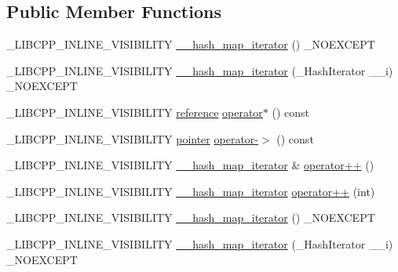 \subsection*{Public Member Functions}
\begin{DoxyCompactItemize}
\item 
\+\_\+\+L\+I\+B\+C\+P\+P\+\_\+\+I\+N\+L\+I\+N\+E\+\_\+\+V\+I\+S\+I\+B\+I\+L\+I\+T\+Y \hyperlink{class____hash__map__iterator_aa78e239cc41a9db787a22d9124f97489}{\+\_\+\+\_\+hash\+\_\+map\+\_\+iterator} () \+\_\+\+N\+O\+E\+X\+C\+E\+P\+T
\item 
\+\_\+\+L\+I\+B\+C\+P\+P\+\_\+\+I\+N\+L\+I\+N\+E\+\_\+\+V\+I\+S\+I\+B\+I\+L\+I\+T\+Y \hyperlink{class____hash__map__iterator_a09814e9e10860c0e510f242332eb5d1c}{\+\_\+\+\_\+hash\+\_\+map\+\_\+iterator} (\+\_\+\+Hash\+Iterator \+\_\+\+\_\+i) \+\_\+\+N\+O\+E\+X\+C\+E\+P\+T
\item 
\+\_\+\+L\+I\+B\+C\+P\+P\+\_\+\+I\+N\+L\+I\+N\+E\+\_\+\+V\+I\+S\+I\+B\+I\+L\+I\+T\+Y \hyperlink{class____hash__map__iterator_a61a3f5fd8f3139155d5ceb11d125af3e}{reference} \hyperlink{class____hash__map__iterator_ac19c020c2d4828b1121f839e8291d7e8}{operator$\ast$} () const 
\item 
\+\_\+\+L\+I\+B\+C\+P\+P\+\_\+\+I\+N\+L\+I\+N\+E\+\_\+\+V\+I\+S\+I\+B\+I\+L\+I\+T\+Y \hyperlink{class____hash__map__iterator_a70e6b7226949cef63f92500927ca19a3}{pointer} \hyperlink{class____hash__map__iterator_a9b3fb50f9aa2aaf1681c8fc1858129bc}{operator-\/$>$} () const 
\item 
\+\_\+\+L\+I\+B\+C\+P\+P\+\_\+\+I\+N\+L\+I\+N\+E\+\_\+\+V\+I\+S\+I\+B\+I\+L\+I\+T\+Y \hyperlink{class____hash__map__iterator}{\+\_\+\+\_\+hash\+\_\+map\+\_\+iterator} \& \hyperlink{class____hash__map__iterator_a682b61b1184a2a00861fbcd184b00519}{operator++} ()
\item 
\+\_\+\+L\+I\+B\+C\+P\+P\+\_\+\+I\+N\+L\+I\+N\+E\+\_\+\+V\+I\+S\+I\+B\+I\+L\+I\+T\+Y \hyperlink{class____hash__map__iterator}{\+\_\+\+\_\+hash\+\_\+map\+\_\+iterator} \hyperlink{class____hash__map__iterator_a5c0cda7f7d07af2c7f7e7ce9a4a82572}{operator++} (int)
\item 
\+\_\+\+L\+I\+B\+C\+P\+P\+\_\+\+I\+N\+L\+I\+N\+E\+\_\+\+V\+I\+S\+I\+B\+I\+L\+I\+T\+Y \hyperlink{class____hash__map__iterator_aa78e239cc41a9db787a22d9124f97489}{\+\_\+\+\_\+hash\+\_\+map\+\_\+iterator} () \+\_\+\+N\+O\+E\+X\+C\+E\+P\+T
\item 
\+\_\+\+L\+I\+B\+C\+P\+P\+\_\+\+I\+N\+L\+I\+N\+E\+\_\+\+V\+I\+S\+I\+B\+I\+L\+I\+T\+Y \hyperlink{class____hash__map__iterator_a09814e9e10860c0e510f242332eb5d1c}{\+\_\+\+\_\+hash\+\_\+map\+\_\+iterator} (\+\_\+\+Hash\+Iterator \+\_\+\+\_\+i) \+\_\+\+N\+O\+E\+X\+C\+E\+P\+T

\end{DoxyCompactItemize}
